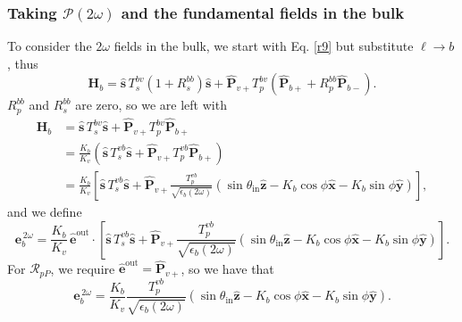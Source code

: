 \subsubsection{Taking \texorpdfstring{$\mathcal{P}(2\omega)$}{P(2w)} and the
fundamental fields in the bulk}

To consider the $2\omega$ fields in the bulk, we start with Eq. \eqref{r9} but
substitute $\ell\rightarrow b$, thus
\begin{equation*}
\mathbf{H}_{b}
= \hat{\mathbf{s}}\,T_s^{b v}\left(1+R_{s}^{b b}\right)\hat{\mathbf{s}}
+ \hat{\mathbf{P}}_{v+}T_{p}^{b v}
\left(
\hat{\mathbf{P}}_{b+} + R_{p}^{b b}\hat{\mathbf{P}}_{b-}
\right).
\end{equation*}
$R_{p}^{b b}$ and $R_{s}^{b b}$ are zero, so we are left with
\begin{equation*}
\begin{split}
\mathbf{H}_{b}
&= \hat{\mathbf{s}}\,T_s^{b v}\hat{\mathbf{s}}
 + \hat{\mathbf{P}}_{v+}T_{p}^{b v}\hat{\mathbf{P}}_{b+}\\
&= \frac{K_{b}}{K_{v}}\left(\hat{\mathbf{s}}\,T_s^{vb}\hat{\mathbf{s}}
 + \hat{\mathbf{P}}_{v+}T_{p}^{vb}\hat{\mathbf{P}}_{b+}\right)\\
&= \frac{K_{b}}{K_{v}}
   \left[
   \hat{\mathbf{s}}\,T_s^{vb}\hat{\mathbf{s}}
 + \hat{\mathbf{P}}_{v+}
   \frac{T_{p}^{vb}}{\sqrt{\epsilon_{b}(2\omega)}}
   (\sin\theta_{\mathrm{in}}\hat{\mathbf{z}}
 - K_{b}\cos\phi\hat{\mathbf{x}} 
 - K_{b}\sin\phi\hat{\mathbf{y}})
   \right],
\end{split}
\end{equation*}
and we define
\begin{equation*}
\mathbf{e}^{\,2\omega}_{b}
= \frac{K_{b}}{K_{v}}\,\hat{\mathbf{e}}^{\mathrm{out}}\cdot
\left[
   \hat{\mathbf{s}}\,T_s^{vb}\hat{\mathbf{s}}
 + \hat{\mathbf{P}}_{v+}
   \frac{T_{p}^{vb}}{\sqrt{\epsilon_{b}(2\omega)}}
   (\sin\theta_{\mathrm{in}}\hat{\mathbf{z}}
 - K_{b}\cos\phi\hat{\mathbf{x}} 
 - K_{b}\sin\phi\hat{\mathbf{y}})
   \right].
\end{equation*}
For $\mathcal{R}_{pP}$, we require
$\hat{\mathbf{e}}^{\mathrm{out}}=\hat{\mathbf{P}}_{v+}$, so we have that
\begin{equation*}
\mathbf{e}^{\,2\omega}_{b}
= \frac{K_{b}}{K_{v}}
  \frac{T_{p}^{vb}}{\sqrt{\epsilon_{b}(2\omega)}}
  (\sin\theta_{\mathrm{in}}\hat{\mathbf{z}}
- K_{b}\cos\phi\hat{\mathbf{x}} 
- K_{b}\sin\phi\hat{\mathbf{y}}).
\end{equation*}


